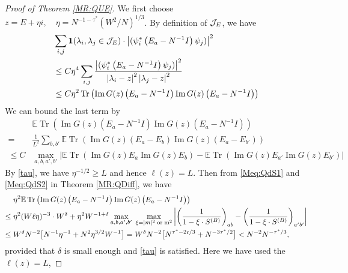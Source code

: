 \documentclass[10pt,reqno]{article}
\DeclareMathOperator{\tr}{Tr}
\theoremstyle{plain} %
\theoremstyle{remark}
\numberwithin{equation}{section}
\begin{document}
\begin{proof}[Proof of Theorem \ref{MR:QUE}]  

We first choose  $  z=E+\eta i, \quad \eta= N^{-1-\tau ^* }(W^2/N)^{1/3}$.
By definition of $ {\cal J}_E$, we have 
\begin{align}\label{ssfa2}
& \sum_{i,j} \textbf{1}(\lambda_i,\lambda_j\in {\cal J}_E)\cdot \left|(\psi_i^*\left(E_a-N^{-1}I\right) \psi_j)\right|^2 \nonumber \\
& 
\le C \eta^4 \sum_{i, j  } \frac{\left|(\psi_i^*\left(E_a-N^{-1}I\right) \psi_j)\right|^2}{\left|\lambda_i-z\right|^2\left|\lambda_j-z\right|^2}\\\nonumber
& \le 
 C \eta^2\tr \left(\operatorname{Im} G(z)\left(E_a-N^{-1}I\right) \operatorname{Im} G(z)\left(E_a-N^{-1}I\right)\right)
\end{align}
We can bound the last term by 
\begin{align}\label{que0} 
 &\mathbb{E}  \tr \left(\operatorname{Im} G(z)\left(E_a-N^{-1}I\right) \operatorname{Im} G(z)\left(E_a-N^{-1}I\right)\right)
  \\ 
=&\frac{1}{L^2}\sum_{b,b'}
\mathbb{E}  
 \tr \left(\operatorname{Im} G(z)\left(E_a-E_b\right) \operatorname{Im} G(z)\left(E_a-E_{b'}\right)\right)
\nonumber \\ \nonumber
\le C&\max_{a,b,a',b'}
\Big|\mathbb{E}\tr \left(\operatorname{Im} G(z) E_a  \operatorname{Im} G(z)E_b \right)
-\mathbb{E}\tr \left(\operatorname{Im} G(z) E_{a'}  \operatorname{Im} G(z)E_{b'}\right) \Big| 
\end{align}
By \eqref{tau},    we have $ \eta^{-1/2} \ge L$ and hence $\ell(z)=L$.
Then from \eqref{Meq:QdS1} and \eqref{Meq:QdS2} in Theorem \ref{MR:QDiff}, 
we have 
 \begin{align}
 \;& \eta^2 \mathbb{E}  \tr \left(\operatorname{Im} G(z)\left(E_a-N^{-1}I\right) \operatorname{Im} G(z)\left(E_a-N^{-1}I\right)\right)
\nonumber \\
\le \;& \eta^2 (W\ell\eta)^{-3}\cdot W^{\delta} + \eta^2 W^{-1+\delta}\max_{a,b,a',b'}\;\max_{ \xi=|m|^2 \; \rm or\; m^2}
\left| \left(\frac{1}{1-\xi\cdot S^{(B)}}\right)_{ab}-\left(\frac{1}{1-\xi\cdot S^{(B)}}\right)_{a'b'}\right|
\nonumber \\\nonumber
\le \;&   W^{\delta} N^{-2} \big [ N^{-1}\eta^{-1}  +  N^2 \eta^{3/2} W^{-1}  \big ] =   W^{\delta} N^{-2} \big [ N^{\tau ^*-2 \mathfrak c /3}  + N^{-3 \tau ^*/2}  \big ] 
<   N^{-2}  N^{- \tau ^* /3},  
 \end{align}
provided that  $\delta$ is small enough and \eqref{tau} is satisfied. Here  we have used  the $\ell(z)=L$, 

\end{proof}
\end{document}
